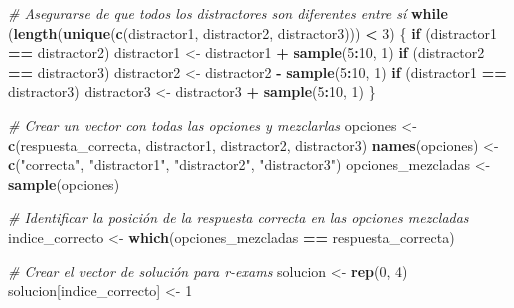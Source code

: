 \documentclass[
]{article}
\newenvironment{Shaded}{\begin{snugshade}}{\end{snugshade}}
\newcommand{\CommentTok}[1]{\textcolor[rgb]{0.56,0.35,0.01}{\textit{#1}}}
\newcommand{\ControlFlowTok}[1]{\textcolor[rgb]{0.13,0.29,0.53}{\textbf{#1}}}
\newcommand{\DecValTok}[1]{\textcolor[rgb]{0.00,0.00,0.81}{#1}}
\newcommand{\FunctionTok}[1]{\textcolor[rgb]{0.13,0.29,0.53}{\textbf{#1}}}
\newcommand{\NormalTok}[1]{#1}
\newcommand{\OtherTok}[1]{\textcolor[rgb]{0.56,0.35,0.01}{#1}}
\newcommand{\SpecialCharTok}[1]{\textcolor[rgb]{0.81,0.36,0.00}{\textbf{#1}}}
\newcommand{\StringTok}[1]{\textcolor[rgb]{0.31,0.60,0.02}{#1}}
\begin{document}
\begin{Shaded}
\begin{Highlighting}[]
\CommentTok{\# Asegurarse de que todos los distractores son diferentes entre sí}
\ControlFlowTok{while}\NormalTok{ (}\FunctionTok{length}\NormalTok{(}\FunctionTok{unique}\NormalTok{(}\FunctionTok{c}\NormalTok{(distractor1, distractor2, distractor3))) }\SpecialCharTok{\textless{}} \DecValTok{3}\NormalTok{) \{}
  \ControlFlowTok{if}\NormalTok{ (distractor1 }\SpecialCharTok{==}\NormalTok{ distractor2) distractor1 }\OtherTok{\textless{}{-}}\NormalTok{ distractor1 }\SpecialCharTok{+} \FunctionTok{sample}\NormalTok{(}\DecValTok{5}\SpecialCharTok{:}\DecValTok{10}\NormalTok{, }\DecValTok{1}\NormalTok{)}
  \ControlFlowTok{if}\NormalTok{ (distractor2 }\SpecialCharTok{==}\NormalTok{ distractor3) distractor2 }\OtherTok{\textless{}{-}}\NormalTok{ distractor2 }\SpecialCharTok{{-}} \FunctionTok{sample}\NormalTok{(}\DecValTok{5}\SpecialCharTok{:}\DecValTok{10}\NormalTok{, }\DecValTok{1}\NormalTok{)}
  \ControlFlowTok{if}\NormalTok{ (distractor1 }\SpecialCharTok{==}\NormalTok{ distractor3) distractor3 }\OtherTok{\textless{}{-}}\NormalTok{ distractor3 }\SpecialCharTok{+} \FunctionTok{sample}\NormalTok{(}\DecValTok{5}\SpecialCharTok{:}\DecValTok{10}\NormalTok{, }\DecValTok{1}\NormalTok{)}
\NormalTok{\}}

\CommentTok{\# Crear un vector con todas las opciones y mezclarlas}
\NormalTok{opciones }\OtherTok{\textless{}{-}} \FunctionTok{c}\NormalTok{(respuesta\_correcta, distractor1, distractor2, distractor3)}
\FunctionTok{names}\NormalTok{(opciones) }\OtherTok{\textless{}{-}} \FunctionTok{c}\NormalTok{(}\StringTok{"correcta"}\NormalTok{, }\StringTok{"distractor1"}\NormalTok{, }\StringTok{"distractor2"}\NormalTok{, }\StringTok{"distractor3"}\NormalTok{)}
\NormalTok{opciones\_mezcladas }\OtherTok{\textless{}{-}} \FunctionTok{sample}\NormalTok{(opciones)}

\CommentTok{\# Identificar la posición de la respuesta correcta en las opciones mezcladas}
\NormalTok{indice\_correcto }\OtherTok{\textless{}{-}} \FunctionTok{which}\NormalTok{(opciones\_mezcladas }\SpecialCharTok{==}\NormalTok{ respuesta\_correcta)}

\CommentTok{\# Crear el vector de solución para r{-}exams}
\NormalTok{solucion }\OtherTok{\textless{}{-}} \FunctionTok{rep}\NormalTok{(}\DecValTok{0}\NormalTok{, }\DecValTok{4}\NormalTok{)}
\NormalTok{solucion[indice\_correcto] }\OtherTok{\textless{}{-}} \DecValTok{1}
\end{Highlighting}
\end{Shaded}
\end{document}
